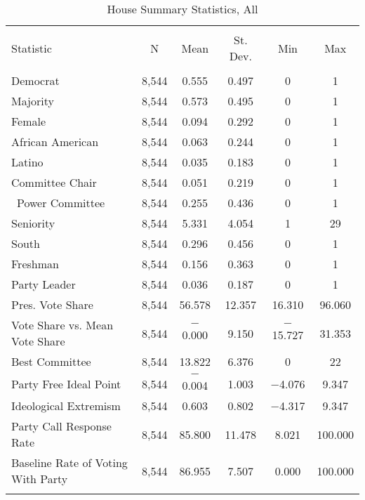 \documentclass[12pt]{article}
\begin{document}
\begin{table}[H] 
	\centering 
	\singlespacing
	\caption{House Summary Statistics, All} 
	\label{} 
	\begin{tabular}{@{\extracolsep{5pt}}lccccc} 
		\\[-1.8ex]\hline 
		\hline \\[-1.8ex] 
		Statistic & \multicolumn{1}{c}{N} & \multicolumn{1}{c}{Mean} & \multicolumn{1}{c}{St. Dev.} & \multicolumn{1}{c}{Min} & \multicolumn{1}{c}{Max} \\ 
		\hline \\[-1.8ex]  
		Democrat & 8,544 & 0.555 & 0.497 & 0 & 1 \\ 
		Majority & 8,544 & 0.573 & 0.495 & 0 & 1 \\ 
		Female & 8,544 & 0.094 & 0.292 & 0 & 1 \\ 
		African American & 8,544 & 0.063 & 0.244 & 0 & 1 \\ 
		Latino & 8,544 & 0.035 & 0.183 & 0 & 1 \\ 
		Committee Chair & 8,544 & 0.051 & 0.219 & 0 & 1 \\ \ 
		Power Committee & 8,544 & 0.255 & 0.436 & 0 & 1 \\ 
		Seniority & 8,544 & 5.331 & 4.054 & 1 & 29 \\ 
		South & 8,544 & 0.296 & 0.456 & 0 & 1 \\ 
		Freshman & 8,544 & 0.156 & 0.363 & 0 & 1 \\ 
		Party Leader & 8,544 & 0.036 & 0.187 & 0 & 1 \\  
		Pres. Vote Share & 8,544 & 56.578 & 12.357 & 16.310 & 96.060 \\ 
		Vote Share vs. Mean Vote Share & 8,544 & $-$0.000 & 9.150 & $-$15.727 & 31.353 \\ 
		Best Committee & 8,544 & 13.822 & 6.376 & 0 & 22 \\ 
		Party Free Ideal Point & 8,544 & $-$0.004 & 1.003 & $-$4.076 & 9.347 \\ 
		Ideological Extremism & 8,544 & 0.603 & 0.802 & $-$4.317 & 9.347 \\ 
		Party Call Response Rate & 8,544 & 85.800 & 11.478 & 8.021 & 100.000 \\ 
		Baseline Rate of Voting With Party & 8,544 & 86.955 & 7.507 & 0.000 & 100.000 \\ 
		\hline \\[-1.8ex] 
	\end{tabular} 
\end{table} 
\end{document}
